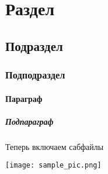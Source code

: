 \documentclass[a4paper]{article}
\begin{document}
	\tableofcontents
	\section{Раздел}
	\blindtext
	\subsection{Подраздел}
	\blindtext
	\subsubsection{Подподраздел}
	\blindtext
	\paragraph{Параграф}
	\blindtext
	\subparagraph{Подпараграф}
	\blindtext
	
	\newpage
	
	\vfill
	
	Теперь включаем сабфайлы
	
	\vfill
	
	\newpage
	
	
	\texttt{[image: sample\_pic.png]}
	
	\tableofcontents
	
	
	
	\nocite{*}
\end{document}
